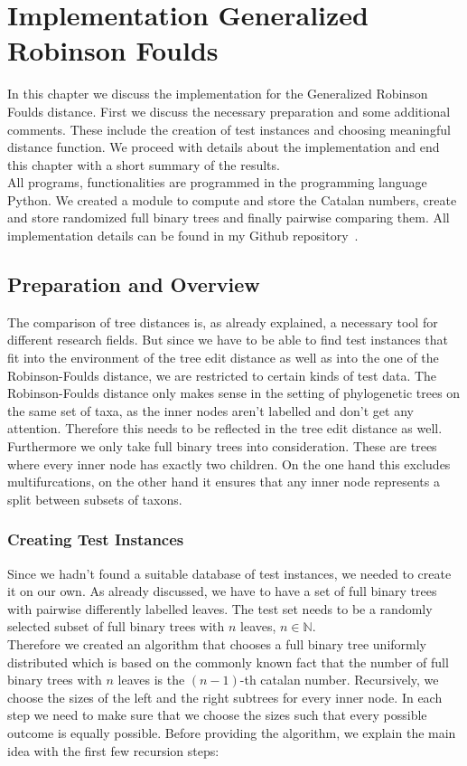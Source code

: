\chapter{Implementation Generalized Robinson Foulds}
In this chapter we discuss the implementation for the Generalized Robinson Foulds distance. First we discuss the necessary preparation and some additional comments. These include the creation of test instances and choosing meaningful distance function. We proceed with details about the implementation and end this chapter with a short summary of the results.\\
All programs, functionalities are programmed in the programming language Python. We created a module to compute and store the Catalan numbers, create and store randomized full binary trees and finally pairwise comparing them. All implementation details can be found in my Github repository~\cite{Git}.

\section{Preparation and Overview}
The comparison of tree distances is, as already explained, a necessary tool for different research fields. But since we have to be able to find test instances that fit into the environment of the tree edit distance as well as into the one of the Robinson-Foulds distance, we are restricted to certain kinds of test data. The Robinson-Foulds distance only makes sense in the setting of phylogenetic trees on the same set of taxa, as the inner nodes aren't labelled and don't get any attention. Therefore this needs to be reflected in the tree edit distance as well. Furthermore we only take full binary trees into consideration. These are trees where every inner node has exactly two children. On the one hand this excludes multifurcations, on the other hand it ensures that any inner node represents a split between subsets of taxons.


\subsection{Creating Test Instances}
Since we hadn't found a suitable database of test instances, we needed to create it on our own. As already discussed, we have to have a set of full binary trees with pairwise differently labelled leaves. The test set needs to be a randomly selected subset of full binary trees with $n$ leaves, $n \in \mathbb{N}$.\\
Therefore we created an algorithm that chooses a full binary tree uniformly distributed which is based on the commonly known fact that the number of full binary trees with $n$ leaves is the $(n-1)$-th catalan number. Recursively, we choose the sizes of the left and the right subtrees for every inner node. In each step we need to make sure that we choose the sizes such that every possible outcome is equally possible. Before providing the algorithm, we explain the main idea with the first few recursion steps:

